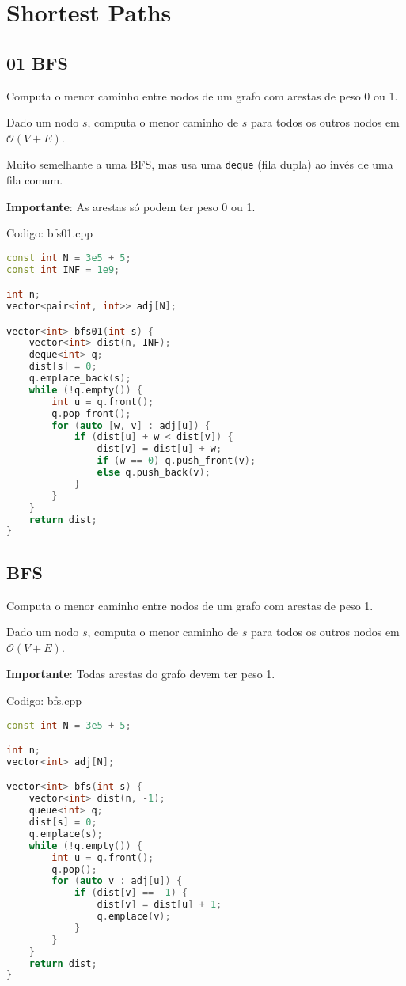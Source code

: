 \documentclass[10pt, a4paper, oneside]{book}
\begin{document}
\section{Shortest Paths}
\subsection{01 BFS}


Computa o menor caminho entre nodos de um grafo com arestas de peso 0 ou 1.



Dado um nodo $s$, computa o menor caminho de $s$ para todos os outros nodos em $\mathcal{O}(V + E)$.



Muito semelhante a uma BFS, mas usa uma \texttt{deque} (fila dupla) ao invés de uma fila comum.



\textbf{Importante}: As arestas só podem ter peso 0 ou 1.
\hfill

Codigo: bfs01.cpp

\begin{lstlisting}[language=C++]
const int N = 3e5 + 5;
const int INF = 1e9;

int n;
vector<pair<int, int>> adj[N];

vector<int> bfs01(int s) {
    vector<int> dist(n, INF);
    deque<int> q;
    dist[s] = 0;
    q.emplace_back(s);
    while (!q.empty()) {
        int u = q.front();
        q.pop_front();
        for (auto [w, v] : adj[u]) {
            if (dist[u] + w < dist[v]) {
                dist[v] = dist[u] + w;
                if (w == 0) q.push_front(v);
                else q.push_back(v);
            }
        }
    }
    return dist;
}\end{lstlisting}
\hfill

\subsection{BFS}


Computa o menor caminho entre nodos de um grafo com arestas de peso 1.



Dado um nodo $s$, computa o menor caminho de $s$ para todos os outros nodos em $\mathcal{O}(V + E)$.



\textbf{Importante}: Todas arestas do grafo devem ter peso 1.
\hfill

Codigo: bfs.cpp

\begin{lstlisting}[language=C++]
const int N = 3e5 + 5;

int n;
vector<int> adj[N];

vector<int> bfs(int s) {
    vector<int> dist(n, -1);
    queue<int> q;
    dist[s] = 0;
    q.emplace(s);
    while (!q.empty()) {
        int u = q.front();
        q.pop();
        for (auto v : adj[u]) {
            if (dist[v] == -1) {
                dist[v] = dist[u] + 1;
                q.emplace(v);
            }
        }
    }
    return dist;
}\end{lstlisting}
\hfill
\end{document}
